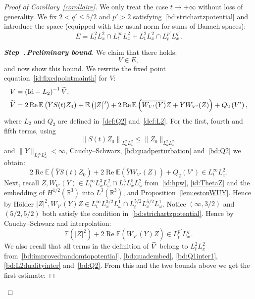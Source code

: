 \documentclass[AHL, Unicode, longabstracts,published]{cedram}
\newcommand{\R}{\mathbb{R}}
\newcommand{\E}{\mathbb{E}}
\DeclareMathOperator{\Rel}{Re}
\newcommand{\Id}{\mathrm{Id}}
\newcounter{stepcount}
\newenvironment{step}[1]{\refstepcounter{stepcount}\begin{proof}[{\bf{Step~\thestepcount}{.\,\emph{#1}}}]}{\let\qed\relax\end{proof}}
\let\oldtilde\tilde
\renewcommand*{\tilde}[1]{\mathchoice{\widetilde{#1}}{\widetilde{#1}}{\oldtilde{#1}}{\oldtilde{#1}}}
\begin{document}
\vspace{6pt}
\begin{proof}[Proof of Corollary~\ref{corollaire}]
We only treat the case $t\rightarrow +\infty$ without loss of generality. We fix $2<q'\leq 5/2$ and $p'>2$ satisfying~\eqref{bd:strichartzpotential} and introduce the space (equipped with the usual norm for sums of Banach spaces):
\begin{equation} \label{id:defE}
E=L^2_tL^2_x\cap L^{\infty}_tL^2_x+ L^2_tL^2_x\cap L^{p'}_tL^{q'}_x.
\end{equation}

\setcounter{stepcount}{0}
\begin{step}{{Preliminary bound}}\label{proofcoro1.2step1}
We claim that there holds:
\begin{equation} \label{bd:VinE}
V\in E,
\end{equation}
and now show this bound. We rewrite the fixed point equation~\eqref{id:fixedpointmainth} for $V$:
\begin{align*}
V &=\left(\Id-L_2\right)^{-1}\tilde V, \\
 \tilde V &=2\Rel\E\left(\bar Y S(t) Z_0\right)+\E\left(|Z|^2\right) +2 \Rel \E\left(\overline{W_{V'}(Y)} Z + \bar Y W_{V'}(Z)\right) + Q_2\left(V'\right),
\end{align*}
where $L_2$ and $Q_2$ are defined in~\eqref{def:Q2} and~\eqref{def:L2}. For the first, fourth and fifth terms, using
\[
\left\|S(t)Z_0\right\|_{L^2_\omega L^2_x}\leq \|Z_0\|_{L^2_\omega L^2_x}
\]
and $\| Y\|_{L^{\infty}_xL^2_\omega}<\infty$, Cauchy--Schwarz, \eqref{bd:quadperturbation} and~\eqref{bd:Q2} we obtain:
\[
2\Rel\E\left(\bar Y S(t) Z_0\right)+2 \Rel \E \left(\bar Y W_{V'}(Z)\right) + Q_2\left(V'\right)\in L^{\infty}_tL^2_x.
\]
Next, recall $Z,W_{V'}(Y)\in L^{\infty}_tL^3_xL^2_\omega\cap L^{5}_tL^5_xL^2_\omega$ from~\eqref{id:hpw}, \eqref{id:ThetaZ} and the embedding of $H^{1/2}(\R^3)$ into $L^{3}(\R^3)$, and Proposition~\ref{lem:estonWUY}. Hence by H\"older $|Z|^2,\overline{W_{V'}(Y)} Z \in L^{\infty}_tL^{3/2}_xL^1_\omega\cap L^{5/2}_tL^{5/2}_xL^1_\omega$. Notice $(\infty,3/2)$ and $(5/2,5/2)$ both satisfy the condition in~\eqref{bd:strichartzpotential}. Hence by Cauchy--Schwarz and interpolation:
\[
\E\left(|Z|^2\right) +2 \Rel \E\left(\overline{W_{V'}(Y)} Z\right) \in L^{p'}_tL^{q'}_x.
\]
We also recall that all terms in the definition of $\tilde V$ belong to $L^2_tL^2_x$ from~\eqref{bd:improvedrandomtopotential}, \eqref{bd:quadembed}, \eqref{bd:Q1inter1}, \eqref{bd:L2dualityinter} and~\eqref{bd:Q2}. From this and the two bounds above we get the first estimate:

\end{step}
\end{proof}
\end{document}
